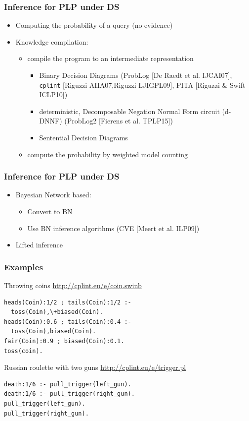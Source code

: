 \documentclass[trans]{beamer}
\begin{document}
\begin{frame}
  \frametitle{Inference for PLP under DS}

  \begin{itemize}
  \item Computing the probability of a query (no evidence)
		\item Knowledge compilation:
  	\begin{itemize}
  		\item compile the program to an intermediate representation
  		\begin{itemize}
  			\item    Binary Decision Diagrams (ProbLog [De Raedt et al. IJCAI07], \texttt{cplint} [Riguzzi AIIA07,Riguzzi LJIGPL09], PITA [Riguzzi \& Swift ICLP10])
  			\item deterministic, Decomposable Negation Normal Form circuit (d-DNNF) (ProbLog2 [Fierens et al. TPLP15])
				\item Sentential Decision Diagrams
  		\end{itemize}
  		\item compute the probability by weighted model counting
  	\end{itemize}
  \end{itemize}
\end{frame}
%



\begin{frame}
  \frametitle{Inference for PLP under DS}

  \begin{itemize}
  	\item Bayesian Network  based:
  \begin{itemize}
  \item Convert to BN
  \item Use BN inference algorithms (CVE [Meert et al. ILP09])
  \end{itemize}
  \item Lifted inference
  \end{itemize}
\end{frame}


\begin{frame}[fragile]
  \frametitle{Examples}
Throwing coins \url{http://cplint.eu/e/coin.swinb}
\begin{verbatim}
heads(Coin):1/2 ; tails(Coin):1/2 :-
  toss(Coin),\+biased(Coin).
heads(Coin):0.6 ; tails(Coin):0.4 :-
  toss(Coin),biased(Coin).
fair(Coin):0.9 ; biased(Coin):0.1.
toss(coin).
\end{verbatim}
Russian roulette with two guns \url{http://cplint.eu/e/trigger.pl}
\begin{verbatim}
death:1/6 :- pull_trigger(left_gun).
death:1/6 :- pull_trigger(right_gun).
pull_trigger(left_gun).
pull_trigger(right_gun).
\end{verbatim}
\end{frame}
\end{document}
